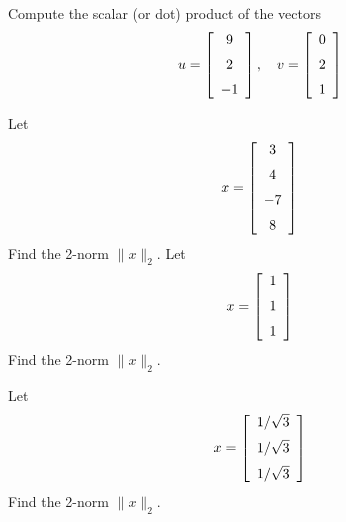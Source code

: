 \documentclass[12pt]{amsbook}
\numberwithin{equation}{section}
\theoremstyle{plain} %
\theoremstyle{definition}
\theoremstyle{remark}
\begin{document}
\bigskip

\begin{Exercise}[title={Scalar product}, difficulty = 0, label = exmm]
	Compute the scalar (or dot) product of the vectors
	$$u =  \left[ \begin {array}{c} 
	9 \\ \noalign{\medskip}       
	2 \\ \noalign{\medskip}        
	-1\end {array}
	\right], \quad v=
	\left[ \begin {array}{cccc} 
	0  \\ \noalign{\medskip}       
	2  \\ \noalign{\medskip}        
	1 \end {array}
	\right] 
	$$
\end{Exercise}

\bigskip

\begin{Exercise}[title={2-norm of a vector}, difficulty = 0, label = exmm]
\Question 	Let 
	$$ x =  \left[ \begin {array}{c} 
	3 \\ \noalign{\medskip}       
	4 \\ \noalign{\medskip}    
	    	-7 \\ \noalign{\medskip}        
	8\end {array}
	\right] 
	$$
	Find the 2-norm $\| x \|_2$.
	\Question 	Let 
	$$ x =  \left[ \begin {array}{c} 
	1 \\ \noalign{\medskip}       
	1 \\ \noalign{\medskip}           
	1\end {array}
	\right] 
	$$
	Find the 2-norm $\| x \|_2$.

	\Question 	Let 
	$$ x =  \left[ \begin {array}{c} 
	1/ \sqrt{3} \\ \noalign{\medskip}       
	1/ \sqrt{3}\\ \noalign{\medskip}           
1/ \sqrt{3}\end {array}
	\right] 
	$$
	Find the 2-norm $\| x \|_2$.

	
\end{Exercise}


\bigskip
\end{document}

